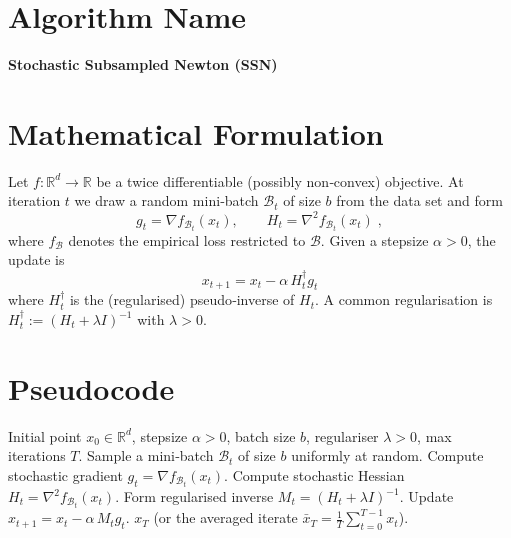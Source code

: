 \documentclass{article}
\newcommand{\R}{\mathbb{R}}
\begin{document}
\section*{Algorithm Name}
\textbf{Stochastic Subsampled Newton (SSN)}  

\section*{Mathematical Formulation}
Let $f:\R^{d}\rightarrow\R$ be a twice differentiable (possibly non‑convex) objective.  
At iteration $t$ we draw a random mini‑batch $\mathcal{B}_{t}$ of size $b$ from the data set and form
\[
g_{t}= \nabla f_{\mathcal{B}_{t}}(x_{t}),\qquad
H_{t}= \nabla^{2} f_{\mathcal{B}_{t}}(x_{t})\;,
\]
where $f_{\mathcal{B}}$ denotes the empirical loss restricted to $\mathcal{B}$.  
Given a stepsize $\alpha>0$, the update is
\[
\boxed{\,x_{t+1}=x_{t}-\alpha\, H_{t}^{\dagger} g_{t}\,}\tag{1}
\]
where $H_{t}^{\dagger}$ is the (regularised) pseudo‑inverse of $H_{t}$.  
A common regularisation is $H_{t}^{\dagger}:=(H_{t}+\lambda I)^{-1}$ with $\lambda>0$.

\section*{Pseudocode}
\begin{algorithm}[H]
\caption{Stochastic Subsampled Newton (SSN)}
\begin{algorithmic}[1]
\Require Initial point $x_{0}\in\R^{d}$, stepsize $\alpha>0$, batch size $b$, regulariser $\lambda>0$, max iterations $T$.
    \State Sample a mini‑batch $\mathcal{B}_{t}$ of size $b$ uniformly at random.
    \State Compute stochastic gradient $g_{t}= \nabla f_{\mathcal{B}_{t}}(x_{t})$.
    \State Compute stochastic Hessian $H_{t}= \nabla^{2} f_{\mathcal{B}_{t}}(x_{t})$.
    \State Form regularised inverse $M_{t}= (H_{t}+\lambda I)^{-1}$.
    \State Update $x_{t+1}=x_{t}-\alpha\,M_{t} g_{t}$.
\EndFor
\State \Return $x_{T}$ (or the averaged iterate $\bar x_{T}=\frac1T\sum_{t=0}^{T-1}x_{t}$).
\end{algorithmic}
\end{algorithm}
\end{document}
